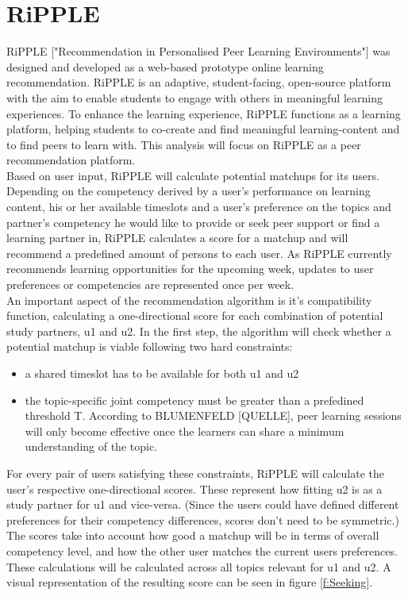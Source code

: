 \documentclass[nochapterpage,bigchapter,linedtoc,longdoc,colorback,accentcolor=tud3b,oneside]{tudreport}
\begin{document}
\section{RiPPLE}
RiPPLE ["Recommendation in Personalised Peer Learning Environments"] was designed and developed as a web-based prototype online learning recommendation. RiPPLE is an adaptive, student-facing, open-source platform with the aim to enable students to engage with others in meaningful learning experiences. To enhance the learning experience, RiPPLE functions as a learning platform, helping students to co-create and find meaningful learning-content and to find peers to learn with. This analysis will focus on RiPPLE as a peer recommendation platform.\\
Based on user input, RiPPLE will calculate potential matchups for its users. Depending on the competency derived by a user's performance on learning content, his or her available timeslots and a user's preference on the topics and partner's competency he would like to provide or seek peer support or find a learning partner in, RiPPLE calculates a score for a matchup and will recommend a predefined amount of persons to each user. As RiPPLE currently recommends learning opportunities for the upcoming week, updates to user preferences or competencies are represented once per week.\\
An important aspect of the recommendation algorithm is it's compatibility function, calculating a one-directional score for each combination of potential study partners, u1 and u2. In the first step, the algorithm will check whether a potential matchup is viable following two hard constraints:
\begin{itemize}
	\item a shared timeslot has to be available for both u1 and u2
	\item the topic-specific joint competency must be greater than a prefedined threshold T. According to BLUMENFELD [QUELLE], peer learning sessions will only become effective once the learners can share a minimum understanding of the topic.
\end{itemize}
For every pair of users satisfying these constraints, RiPPLE will calculate the user's respective one-directional scores. These represent how fitting u2 is as a study partner for u1 and vice-versa. (Since the users could have defined different preferences for their competency differences, scores don't need to be symmetric.) The scores take into account how good a matchup will be in terms of overall competency level, and how the other user matches the current users preferences. These calculations will be calculated across all topics relevant for u1 and u2. A visual representation of the resulting score can be seen in figure \ref{f:Seeking}.\\
\end{document}
